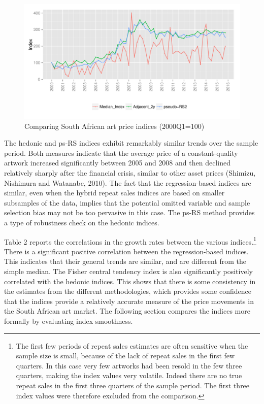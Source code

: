 \documentclass[12pt,]{article}
\let\rmarkdownfootnote\footnote%
\def\footnote{\protect\rmarkdownfootnote}
\begin{document}
\begin{figure}[htbp]
\centering
\includegraphics{Art_Price_Indices_3_files/figure-latex/figure10-1.pdf}
\caption{Comparing South African art price indices (2000Q1=100)}
\end{figure}

The hedonic and ps-RS indices exhibit remarkably similar trends over the
sample period. Both measures indicate that the average price of a
constant-quality artwork increased significantly between 2005 and 2008
and then declined relatively sharply after the financial crisis, similar
to other asset prices (Shimizu, Nishimura and Watanabe, 2010). The fact
that the regression-based indices are similar, even when the hybrid
repeat sales indices are based on smaller subsamples of the data,
implies that the potential omitted variable and sample selection bias
may not be too pervasive in this case. The ps-RS method provides a type
of robustness check on the hedonic indices.

Table 2 reports the correlations in the growth rates between the various
indices.\footnote{The first few periods of repeat sales estimates are
  often sensitive when the sample size is small, because of the lack of
  repeat sales in the first few quarters. In this case very few artworks
  had been resold in the few three quarters, making the index values
  very volatile. Indeed there are no true repeat sales in the first
  three quarters of the sample period. The first three index values were
  therefore excluded from the comparison.} There is a significant
positive correlation between the regression-based indices. This
indicates that their general trends are similar, and are different from
the simple median. The Fisher central tendency index is also
significantly positively correlated with the hedonic indices. This shows
that there is some consistency in the estimates from the different
methodologies, which provides some confidence that the indices provide a
relatively accurate measure of the price movements in the South African
art market. The following section compares the indices more formally by
evaluating index smoothness.
\end{document}
